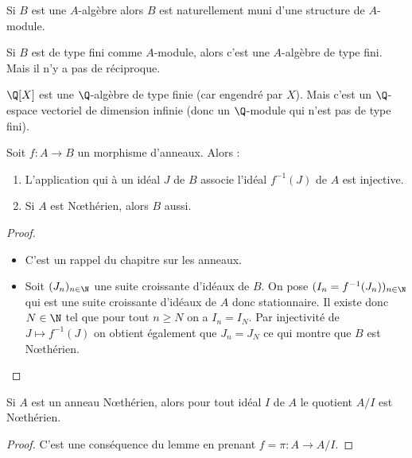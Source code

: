 \begin{example}[Rappel] Si $B$ est une $A$-algèbre alors $B$ est naturellement
muni d'une structure de $A$-module.
\end{example}
\begin{example}[Proposition]
Si $B$ est de type fini comme $A$-module, alors c'est une $A$-algèbre de type
fini. Mais il n'y a pas de réciproque.
\end{example}
\begin{example}
 $\Q[X]$ est une $\Q$-algèbre de type finie (car engendré par $X$). Mais c'est
un $\Q$-espace vectoriel de dimension infinie (donc un $\Q$-module qui n'est
pas de type fini).
\end{example}

\begin{lemm}
 
 Soit $f : A \rightarrow B$ un morphisme d'anneaux. Alors :
 \begin{enumerate}
  \item L'application qui à un idéal $J$ de $B$ associe l'idéal $f^{-1}(J)$ de
$A$ est injective.
\item Si $A$ est N\oe{}thérien, alors $B$ aussi.
 \end{enumerate}
\end{lemm}

\begin{proof}\
\begin{itemize}
 \item C'est un rappel du chapitre sur les anneaux.
 \item Soit $(J_n)_{n\in\N}$ une suite croissante d'idéaux de $B$. On pose
$(I_n = f^{-1}(J_n))_{n\in\N}$ qui est une suite croissante d'idéaux de $A$
donc stationnaire. Il existe donc $N\in\N$ tel que pour tout $n\geq N$ on a
$I_n=I_N$. Par injectivité de $J\mapsto f^{-1}(J)$ on obtient également que
$J_n = J_N$ ce qui montre que $B$ est N\oe{}thérien.
\end{itemize}
\end{proof}


\begin{prop}
 
 Si $A$ est un anneau N\oe{}thérien, alors pour tout idéal $I$ de $A$ le
quotient $A/I$ est N\oe{}thérien.
\end{prop}
\begin{proof}
 C'est une conséquence du lemme en prenant $f = \pi : A \rightarrow A/I$.
\end{proof}


